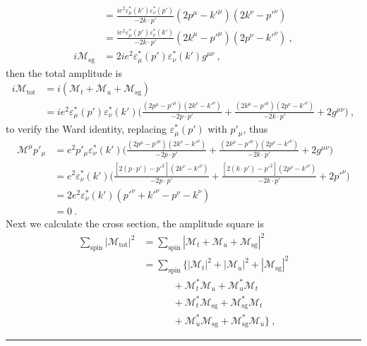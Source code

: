 \documentclass[12pt]{report}
\numberwithin{problemname}{chapter}
\newenvironment{solution}{\vspace{1em}\par\noindent{\large\textbf{\textsc{Solution}}}\par}{\vspace{1em}\hrule}
\begin{document}
\begin{solution}
\begin{align}
        &=\frac{ie^2\varepsilon^*_{\mu}(k')\varepsilon^*_{\nu}(p')}{-2k\cdot p'}(2p^{\mu}-k'^{\mu})(2k^{\nu}-p'^{\nu}) \nonumber \\
        &=\frac{ie^2\varepsilon^*_{\mu}(p')\varepsilon^*_{\nu}(k')}{-2k\cdot p'}(2k^{\mu}-p'^{\mu})(2p^{\nu}-k'^{\nu})\ ,\\
        i\mathcal{M}_{\text{sg}}&=2ie^2\varepsilon^*_{\mu}(p')\varepsilon^*_{\nu}(k')g^{\mu\nu}\ ,
    \end{align}
    then the total amplitude is
    \begin{align}
        i\mathcal{M}_{\text{tot}}&=i(\mathcal{M}_t+\mathcal{M}_u+\mathcal{M}_{\text{sg}}) \nonumber \\
        &=ie^2\varepsilon^*_{\mu}(p')\varepsilon^*_{\nu}(k')\bigg(\frac{(2p^{\mu}-p'^{\mu})(2k^{\nu}-k'^{\nu})}{-2p\cdot p'}+\frac{(2k^{\mu}-p'^{\mu})(2p^{\nu}-k'^{\nu})}{-2k\cdot p'}+2g^{\mu\nu}\bigg)\ ,
    \end{align}
    to verify the Ward identity, replacing $\varepsilon^*_{\mu}(p')$ with $p'_{\mu}$, thus
    \begin{align}
        \mathcal{M}^{\mu}p'_{\mu}&=e^2p'_{\mu}\varepsilon^*_{\nu}(k')\bigg(\frac{(2p^{\mu}-p'^{\mu})(2k^{\nu}-k'^{\nu})}{-2p\cdot p'}+\frac{(2k^{\mu}-p'^{\mu})(2p^{\nu}-k'^{\nu})}{-2k\cdot p'}+2g^{\mu\nu}\bigg) \nonumber \\
        &=e^2\varepsilon^*_{\nu}(k')\bigg(\frac{[2(p\cdot p')-p'^2](2k^{\nu}-k'^{\nu})}{-2p\cdot p'}+\frac{[2(k\cdot p')-p'^2](2p^{\nu}-k'^{\nu})}{-2k\cdot p'}+2p'^{\nu}\bigg) \nonumber \\
        &=2e^2\varepsilon^*_{\nu}(k')(p'^{\nu}+k'^{\nu}-p^{\nu}-k^{\nu}) \nonumber \\
        &=0\ .
    \end{align}
    Next we calculate the cross section, the amplitude square is
    \begin{align}
        \sum_{\text{spin}}|\mathcal{M}_{\text{tot}}|^2&=\sum_{\text{spin}}|\mathcal{M}_t+\mathcal{M}_u+\mathcal{M}_{\text{sg}}|^2 \nonumber \\
        &=\sum_{\text{spin}}\bigg\{|\mathcal{M}_t|^2+|\mathcal{M}_u|^2+|\mathcal{M}_{\text{sg}}|^2 \nonumber \\
        &\quad\quad\quad+\mathcal{M}_t^*\mathcal{M}_u+\mathcal{M}_u^*\mathcal{M}_t \nonumber \\
        &\quad\quad\quad+\mathcal{M}_t^*\mathcal{M}_{\text{sg}}+\mathcal{M}_{\text{sg}}^*\mathcal{M}_t \nonumber \\
        &\quad\quad\quad+\mathcal{M}_u^*\mathcal{M}_{\text{sg}}+\mathcal{M}_{\text{sg}}^*\mathcal{M}_u\bigg\}\ ,

\end{align}
\end{solution}
\end{document}
